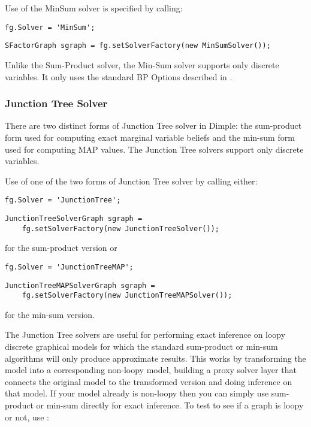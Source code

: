 Use of the MinSum solver is specified by calling:

\ifmatlab
\begin{lstlisting}
fg.Solver = 'MinSum';
\end{lstlisting}
\fi

\ifjava
\begin{lstlisting}
SFactorGraph sgraph = fg.setSolverFactory(new MinSumSolver());
\end{lstlisting}
\fi

Unlike the Sum-Product solver, the Min-Sum solver supports only discrete variables. It only
uses the standard BP Options described in .

\clearpage
\subsubsection{Junction Tree Solver}
\label{sec:JunctionTreeSolverAPI}

There are two distinct forms of Junction Tree solver in Dimple: the sum-product form used for computing exact marginal variable beliefs and the min-sum form used for computing MAP values.  The Junction Tree solvers support only discrete variables.

Use of one of the two forms of Junction Tree solver by calling either:

\ifmatlab
\begin{lstlisting}
fg.Solver = 'JunctionTree';
\end{lstlisting}
\fi

\ifjava
\begin{lstlisting}
JunctionTreeSolverGraph sgraph =
    fg.setSolverFactory(new JunctionTreeSolver());
\end{lstlisting}
\fi

for the sum-product version or

\ifmatlab
\begin{lstlisting}
fg.Solver = 'JunctionTreeMAP';
\end{lstlisting}
\fi

\ifjava
\begin{lstlisting}
JunctionTreeMAPSolverGraph sgraph =
    fg.setSolverFactory(new JunctionTreeMAPSolver());
\end{lstlisting}
\fi

for the min-sum version.

The Junction Tree solvers are useful for performing exact inference on loopy discrete graphical models for which the standard sum-product or min-sum algorithms will only produce approximate results. This works by transforming the model into a corresponding non-loopy model, building a proxy solver layer that connects the original model to the transformed version and doing inference on that model. If your model already is non-loopy then you can simply use sum-product or min-sum directly for exact inference. To test to see if a graph is loopy or not, use :

